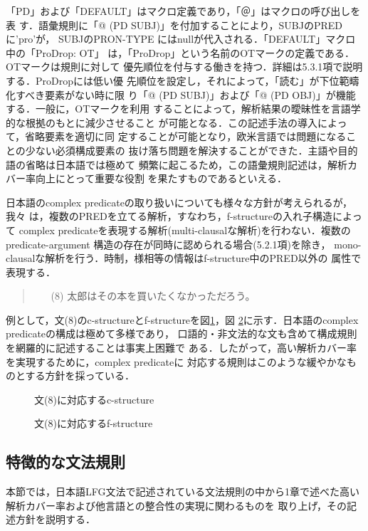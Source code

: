 「PD」および「DEFAULT」はマクロ定義であり，「＠」はマクロの呼び出しを表
す．語彙規則に「@ (PD SUBJ)」を付加することにより，SUBJのPREDに'pro'が，
SUBJのPRON-TYPE にはnullが代入される．「DEFAULT」マクロ中の「ProDrop: OT」
は，「ProDrop」という名前のOTマークの定義である．OTマークは規則に対して
優先順位を付与する働きを持つ．詳細は5.3.1項で説明する．ProDropには低い優
先順位を設定し，それによって，「読む」が下位範疇化すべき要素がない時に限
り「@ (PD SUBJ)」および「@ (PD OBJ)」が機能する．一般に，OTマークを利用
することによって，解析結果の曖昧性を言語学的な根拠のもとに減少させること
が可能となる\cite{B2001}．この記述手法の導入によって，省略要素を適切に同
定することが可能となり，欧米言語では問題になることの少ない必須構成要素の
抜け落ち問題を解決することができた．主語や目的語の省略は日本語では極めて
頻繁に起こるため，この語彙規則記述は，解析カバー率向上にとって重要な役割
を果たすものであるといえる．

日本語のcomplex predicateの取り扱いについても様々な方針が考えられるが，我々
は，複数のPREDを立てる解析，すなわち，f-structureの入れ子構造によって
complex predicateを表現する解析(multi-clausalな解析)を行わない．複数の
predicate-argument 構造の存在が同時に認められる場合(5.2.1項)を除き，
mono-clausalな解析を行う．時制，様相等の情報はf-structure中のPRED以外の
属性で表現する．
\begin{quote}
\begin{itemize}
\item[(8)]太郎はその本を買いたくなかっただろう。
\end{itemize}
\end{quote}
例として，文(8)のc-structureとf-structureを図\ref{fig4-2c}，図
\ref{fig4-2f}に示す．日本語のcomplex predicateの構成は極めて多様であり，
口語的・非文法的な文も含めて構成規則を網羅的に記述することは事実上困難で
ある．したがって，高い解析カバー率を実現するために，complex predicateに
対応する規則はこのような緩やかなものとする方針を採っている．
\begin{figure}[htbp]
\center
\epsfxsize=74.90mm
\caption{文(8)に対応するc-structure}
\label{fig4-2c}
\end{figure}
\begin{figure}[htbp]
\center 
\epsfxsize=121.9mm
\caption{文(8)に対応するf-structure}
\label{fig4-2f}
\end{figure}
\subsection{特徴的な文法規則}
本節では，日本語LFG文法で記述されている文法規則の中から1章で述べた高い
解析カバー率および他言語との整合性の実現に関わるものを
取り上げ，その記述方針を説明する．

